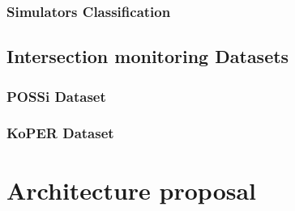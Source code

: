 \subsubsection{Simulators Classification}
\subsection{Intersection monitoring Datasets}
\subsubsection{POSSi Dataset}
\subsubsection{KoPER Dataset}

\section{Architecture proposal}